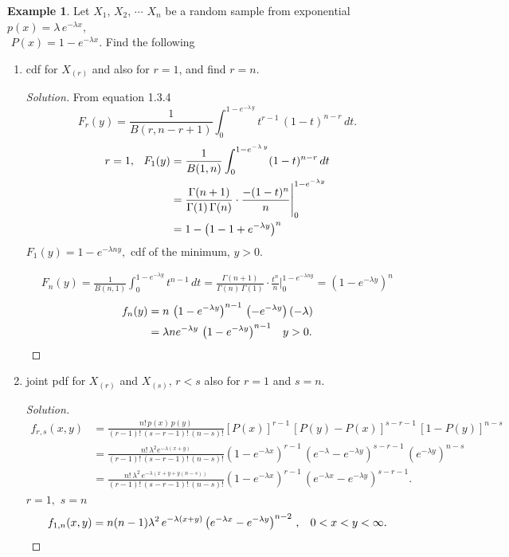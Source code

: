 \documentclass[12pt,a4paper]{report}
\theoremstyle{definition}
\newtheorem{exa}[thm]{Example}
\theoremstyle{plain}
\begin{document}
\begin{exa}
Let $X_1, \, X_2, \, \cdots\, \, X_n$ be a random sample from exponential $p(x) = \lambda\, e^{-\lambda x},$\\ $\, \, P(x) = 1 - e^{-\lambda x}$. Find the following
\begin{enumerate}
\item[(i)] cdf for $X_{(r)}$ and also for $r = 1$, and find $r = n$.
\begin{proof}[Solution]
From equation 1.3.4
$$F_r(y)  = \frac{1}{B(r, n- r + 1)} \int_0^{1 - e^{-\lambda\, y}}t^{r - 1}\, (1 - t)^{n - r}\, dt.$$
\begin{align*}
r  = 1, \, \hspace{0.2cm} F_1(y) & = \frac{1}{B(1, n)} \int_0^{1 - e^{-\lambda\, y}} (1 - t)^{n - r}\, dt\\
 &  =  \frac{\Gamma(n + 1)}{\Gamma(1)\, \Gamma(n)}\cdot\frac{-(1 - t)^{n}}{n}\Bigg|^{1 - e^{-\lambda y}}_0\\
 & = 1 - \left(1 - 1 + e^{-\lambda y}\right)^n
\end{align*}
$F_1(y) = 1 - e^{-\lambda n y},$ cdf of the minimum, $y > 0$.

\begin{align*}
F_n(y)  = \frac{1}{B(n,1)}\int_0^{1 - e^{-\lambda y}}t^{n - 1}\, dt
 = \frac{\Gamma(n + 1)}{\Gamma(n)\, \Gamma(1)}\cdot\frac{t^n}{n}\Bigg|^{1 - e^{-\lambda n y}}_0
 = \left(1 - e^{-\lambda y}\right)^n
\end{align*}
\begin{align*}
f_n(y) & = n\, \left(1 - e^{-\lambda y}\right)^{n - 1}\, \left(-e^{-\lambda y}\right)\left(-\lambda\right)\\
& = \lambda n e^{-\lambda y}\, \left(1 - e^{-\lambda y}\right)^{n - 1}\hspace{0.3cm} y > 0.
\end{align*}
\end{proof}


\item[(ii)] joint pdf for $X_{(r)}$ and $X_{(s)}, \, r < s$ also for $r = 1$ and $s = n$.
\begin{proof}[Solution]
\begin{align*}
f_{r,s}(x,y) & = \frac{n!\, p(x)\, p(y)}{(r - 1)!\, (s-r-1)!\, (n - s)!}\left[P(x)\right]^{r - 1}\, \left[P(y) - P(x)\right]^{s - r - 1}\, \left[1 - P(y)\right]^{n - s}\\
& = \frac{n!\, \lambda^2e^{-\lambda (x + y)}}{(r - 1)!\, (s - r - 1)!\, (n - s)!}\left(1 - e^{-\lambda x}\right)^{r - 1}\, \left(e^{-\lambda} - e^{-\lambda y}\right)^{s - r - 1}\, \left(e^{-\lambda y}\right)^{n - s}\\
& = \frac{n!\, \lambda^2\, e^{-\lambda (x + y + y(n - s))}}{(r - 1)!\, (s - r - 1)!\, (n - s)!}\left(1 - e^{-\lambda x}\right)^{r - 1}\, \left(e^{-\lambda x} - e^{-\lambda y}\right)^{s - r - 1}.
\end{align*}
$r = 1, \, \, s = n$
$$f_{1,n}(x,y) = n(n - 1)\lambda^2\, e^{-\lambda (x + y)}\left(e^{-\lambda x} - e^{-\lambda y}\right)^{n - 2}\, , \hspace{0.3cm} 0 < x < y < \infty.$$
\end{proof}



\end{enumerate}
\end{exa}
\end{document}
